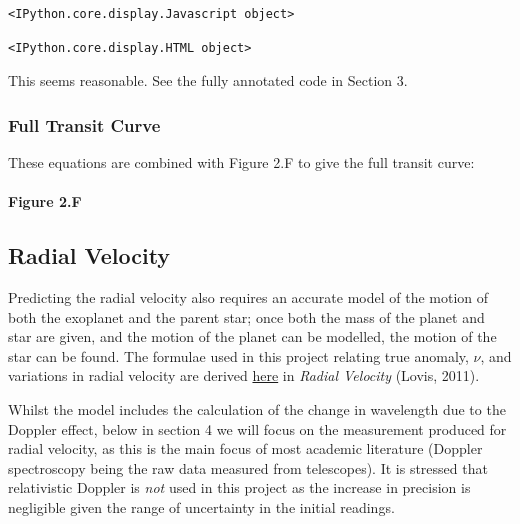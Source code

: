 \documentclass[11pt]{article}
\begin{document}
    
    \begin{Verbatim}[commandchars=\\\{\}]
<IPython.core.display.Javascript object>
    \end{Verbatim}

    
    
    \begin{Verbatim}[commandchars=\\\{\}]
<IPython.core.display.HTML object>
    \end{Verbatim}

    
    This seems reasonable. See the fully annotated code in Section 3.

    \hypertarget{full-transit-curve}{%
\subsubsection{Full Transit Curve}\label{full-transit-curve}}

These equations are combined with Figure 2.F to give the full transit
curve:

    \hypertarget{figure-2.f}{%
\paragraph{Figure 2.F}\label{figure-2.f}}

    \hypertarget{radial-velocity}{%
\subsection{Radial Velocity}\label{radial-velocity}}

Predicting the radial velocity also requires an accurate model of the
motion of both the exoplanet and the parent star; once both the mass of
the planet and star are given, and the motion of the planet can be
modelled, the motion of the star can be found. The formulae used in this
project relating true anomaly, \(\nu\), and variations in radial
velocity are derived
\href{http://exoplanets.astro.yale.edu/workshop/EPRV/Bibliography_files/Radial_Velocity.pdf}{here}
in \emph{Radial Velocity} (Lovis, 2011).

Whilst the model includes the calculation of the change in wavelength
due to the Doppler effect, below in section 4 we will focus on the
measurement produced for radial velocity, as this is the main focus of
most academic literature (Doppler spectroscopy being the raw data
measured from telescopes). It is stressed that relativistic Doppler is
\emph{not} used in this project as the increase in precision is
negligible given the range of uncertainty in the initial readings.
\end{document}
